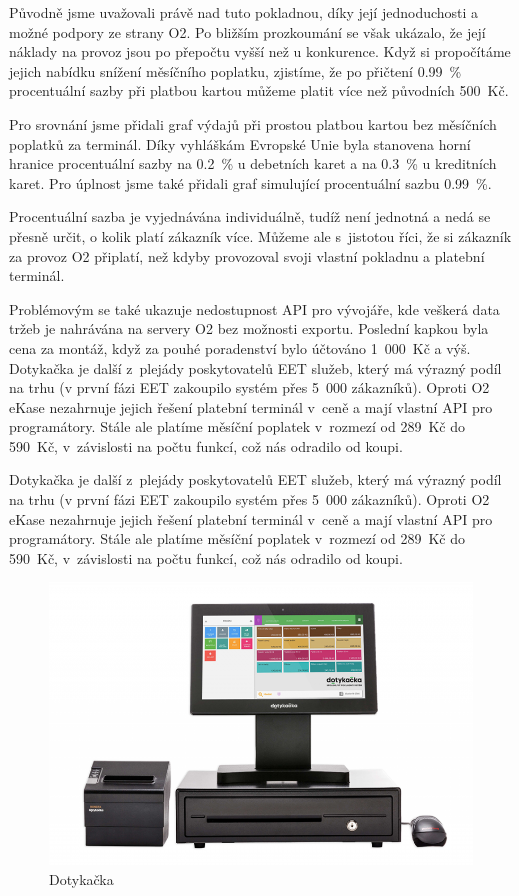 \documentclass[a4paper,11pt,oneside]{article}
\begin{document}
Původně jsme uvažovali právě nad tuto pokladnou, díky její jednoduchosti a možné podpory ze strany O2. Po bližším prozkoumání se však ukázalo, že její náklady na provoz jsou po přepočtu vyšší než u konkurence. Když si propočítáme jejich nabídku snížení měsíčního poplatku, zjistíme, že po přičtení 0.99~\% procentuální sazby při platbou kartou můžeme platit více než původních 500~Kč. 

Pro srovnání jsme přidali graf výdajů při prostou platbou kartou bez měsíčních poplatků za terminál. Díky vyhláškám Evropské Unie byla stanovena horní hranice procentuální sazby na 0.2~\% u debetních karet a na 0.3~\% u kreditních karet. Pro úplnost jsme také přidali graf simulující procentuální sazbu 0.99~\%. 

Procentuální sazba je vyjednávána individuálně, tudíž není jednotná a nedá se přesně určit, o kolik platí zákazník více. Můžeme ale s~jistotou říci, že si zákazník za provoz O2 připlatí, než kdyby provozoval svoji vlastní pokladnu a platební terminál.

Problémovým se také ukazuje nedostupnost API pro vývojáře, kde veškerá data tržeb je nahrávána na servery O2 bez možnosti exportu. Poslední kapkou byla cena za montáž, když za pouhé poradenství bylo účtováno 1~000~Kč a výš. 
Dotykačka je další z~plejády poskytovatelů EET služeb, který má výrazný podíl na trhu (v první fázi EET zakoupilo systém přes 5~000 zákazníků). Oproti O2 eKase nezahrnuje jejich řešení platební terminál v~ceně a mají vlastní API pro programátory. Stále ale platíme měsíční poplatek v~rozmezí od 289~Kč do 590~Kč, v~závislosti na počtu funkcí, což nás odradilo od koupi. 

Dotykačka  je další z~plejády poskytovatelů EET služeb, který má výrazný podíl na trhu (v první fázi EET zakoupilo systém přes 5~000 zákazníků). Oproti O2 eKase nezahrnuje jejich řešení platební terminál v~ceně a mají vlastní API pro programátory. Stále ale platíme měsíční poplatek v~rozmezí od 289~Kč do 590~Kč, v~závislosti na počtu funkcí, což nás odradilo od koupi. 

\begin{figure}[H]
	\centering
	\includegraphics[width=0.7\linewidth]{../dotykacka}
	\caption{Dotykačka}
	\label{fig:dotykacka}
\end{figure}
\end{document}
